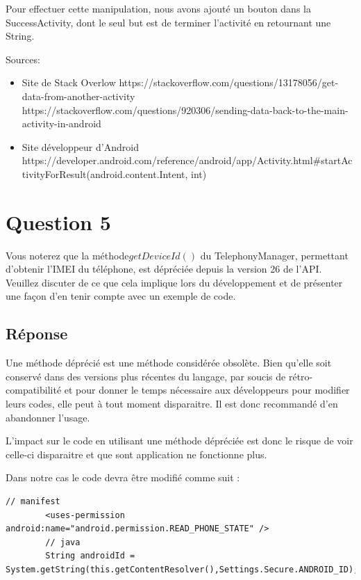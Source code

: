 \documentclass[francais,12pt]{article}
\begin{document}
		 Pour effectuer cette manipulation, nous avons ajouté un bouton dans la SuccessActivity, dont le seul but est de terminer l'activité en retournant une String.
		 
		Sources:
		\begin{itemize}
			\item Site de Stack Overlow\newline
			https://stackoverflow.com/questions/13178056/get-data-from-another-activity\newline
			https://stackoverflow.com/questions/920306/sending-data-back-to-the-main-activity-in-android\newline
			\item Site développeur d'Android\newline
			https://developer.android.com/reference/android/app/Activity.html\#startActivityForResult(android.content.Intent, int)\newline	
		\end{itemize}
		 	 
		 
	\section*{Question 5}
		Vous noterez que la méthode$ getDeviceId()$ du TelephonyManager, permettant d’obtenir l’IMEI du téléphone, est dépréciée depuis la version 26 de l’API. Veuillez discuter de ce que cela implique lors du développement et de présenter une façon d’en tenir compte avec un exemple de code. 
		
		\subsection*{Réponse}
		Une méthode déprécié est une méthode considérée obsolète. Bien qu'elle soit conservé dans des versions plus récentes du langage, par soucis de rétro-compatibilité et pour donner le temps nécessaire aux développeurs pour modifier leurs codes, elle peut à tout moment disparaitre. Il est donc recommandé d'en abandonner l'usage. \newline
		
		L'impact sur le code en utilisant une méthode dépréciée est donc le risque de voir celle-ci disparaitre et que sont application ne fonctionne plus.\newpage
		
		Dans notre cas le code devra être modifié comme suit :\newline
		\begin{lstlisting}[style=javaCode]
		// manifest 
		<uses-permission android:name="android.permission.READ_PHONE_STATE" /> 
		// java
		String androidId = System.getString(this.getContentResolver(),Settings.Secure.ANDROID_ID);
		\end{lstlisting}
\end{document}
